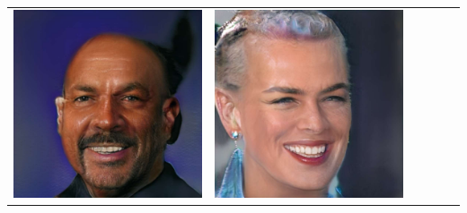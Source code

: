 \documentclass[a0,landscape]{a0poster}
\begin{document}
\begin{multicols}{3}
\begin{center}
\begin{tabular}{cc|cc|cc}
\includegraphics[width=\pganw]{../figures/pgan/54_base_iso_MH.jpg} &
\includegraphics[width=\pganw]{../figures/pgan/55_base_iso_MH.jpg} \\

\end{tabular}
\end{center}
\end{multicols}
\end{document}
